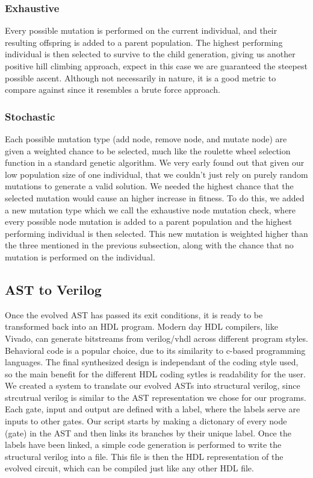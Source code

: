 \documentclass[conference]{IEEEtran}
\begin{document}
{\subsubsection{Exhaustive}
\par Every possible mutation is performed on the current individual, and their resulting offspring is added to a parent population. 
The highest performing individual is then selected to survive to the child generation, giving us another positive hill climbing approach, expect in this case we are guaranteed the steepest possible ascent.
Although not necessarily in nature, it is a good metric to compare against since it resembles a brute force approach.
\subsubsection{Stochastic}
\par Each possible mutation type (add node, remove node, and mutate node) are given a weighted chance to be selected, much like the roulette wheel selection function in a standard genetic algorithm.
We very early found out that given our low population size of one individual, that we couldn't just rely on purely random mutations to generate a valid solution. 
We needed the highest chance that the selected mutation would cause an higher increase in fitness. 
To do this, we added a new mutation type which we call the exhaustive node mutation check, where every possible node mutation is added to a parent population and the highest performing individual is then selected. 
This new mutation is weighted higher than the three mentioned in the previous subsection, along with the chance that no mutation is performed on the individual. 

\subsection{AST to Verilog}
\par Once the evolved AST has passed its exit conditions, it is ready to be transformed back into an HDL program.
Modern day HDL compilers, like Vivado, can generate bitstreams from verilog/vhdl across different program styles.
Behavioral code is a popular choice, due to its similarity to c-based programming languages.
The final synthesized design is independant of the coding style used, so the main benefit for the different HDL coding sytles is readability for the user.
We created a system to translate our evolved ASTs into structural verilog, since strcutrual verilog is similar to the AST representation we chose for our programs.
Each gate, input and output are defined with a label, where the labels serve are inputs to other gates. 
Our script starts by making a dictonary of every node (gate) in the AST and then links its branches by their unique label. 
Once the labels have been linked, a simple code generation is performed to write the structural verilog into a file. 
This file is then the HDL representation of the evolved circuit, which can be compiled just like any other HDL file.

}
\end{document}
